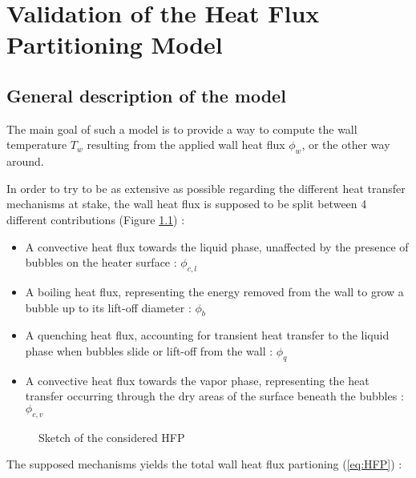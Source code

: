 
\chapter{Validation of the Heat Flux Partitioning Model} %

\label{ch:HFP_validation} %



\section{General description of the model}
\label{sec:model}

The main goal of such a model is to provide a way to compute the wall temperature $T_{w}$ resulting from the applied wall heat flux $\phi_{w}$, or the other way around.

\npar
In order to try to be as extensive as possible regarding the different heat transfer mechanisms at stake, the wall heat flux is supposed to be split between 4 different contributions (Figure \ref{fig:HFP}) :

\begin{itemize}
\item A convective heat flux towards the liquid phase, unaffected by the presence of bubbles on the heater surface : $\phi_{c,l}$
\item A boiling heat flux, representing the energy removed from the wall to grow a bubble up to its lift-off diameter : $\phi_{b}$
\item A quenching heat flux, accounting for transient heat transfer to the liquid phase when bubbles slide or lift-off from the wall : $\phi_{q}$
\item A convective heat flux towards the vapor phase, representing the heat transfer occurring through the dry areas of the surface beneath the bubbles : $\phi_{c,v}$
\end{itemize}



\begin{figure}[h!]
\centering

\caption{Sketch of the considered HFP}
\label{fig:HFP}
\end{figure}


The supposed mechanisms yields the total wall heat flux partioning (\ref{eq:HFP}) :

